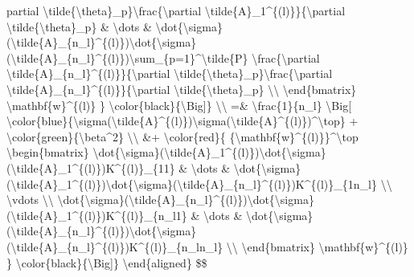 partial \textbackslash tilde\{\textbackslash theta\}\_p\}\textbackslash frac\{\textbackslash partial \textbackslash tilde\{A\}\_1\^{}\{(l)\}\}\{\textbackslash partial \textbackslash tilde\{\textbackslash theta\}\_p\} \& \textbackslash dots \& \textbackslash dot\{\textbackslash sigma\}(\textbackslash tilde\{A\}\_\{n\_l\}\^{}\{(l)\})\textbackslash dot\{\textbackslash sigma\}(\textbackslash tilde\{A\}\_\{n\_l\}\^{}\{(l)\})\textbackslash sum\_\{p=1\}\^{}\textbackslash tilde\{P\} \textbackslash frac\{\textbackslash partial \textbackslash tilde\{A\}\_\{n\_l\}\^{}\{(l)\}\}\{\textbackslash partial \textbackslash tilde\{\textbackslash theta\}\_p\}\textbackslash frac\{\textbackslash partial \textbackslash tilde\{A\}\_\{n\_l\}\^{}\{(l)\}\}\{\textbackslash partial \textbackslash tilde\{\textbackslash theta\}\_p\} \textbackslash\textbackslash{} \textbackslash end\{bmatrix\} \textbackslash mathbf\{w\}\^{}\{(l)\} \} \textbackslash color\{black\}\{\textbackslash Big{]}\} \textbackslash\textbackslash{} =\& \textbackslash frac\{1\}\{n\_l\} \textbackslash Big{[} \textbackslash color\{blue\}\{\textbackslash sigma(\textbackslash tilde\{A\}\^{}\{(l)\})\textbackslash sigma(\textbackslash tilde\{A\}\^{}\{(l)\})\^{}\textbackslash top\} + \textbackslash color\{green\}\{\textbackslash beta\^{}2\} \textbackslash\textbackslash{} \&+ \textbackslash color\{red\}\{ \{\textbackslash mathbf\{w\}\^{}\{(l)\}\}\^{}\textbackslash top \textbackslash begin\{bmatrix\} \textbackslash dot\{\textbackslash sigma\}(\textbackslash tilde\{A\}\_1\^{}\{(l)\})\textbackslash dot\{\textbackslash sigma\}(\textbackslash tilde\{A\}\_1\^{}\{(l)\})K\^{}\{(l)\}\_\{11\} \& \textbackslash dots \& \textbackslash dot\{\textbackslash sigma\}(\textbackslash tilde\{A\}\_1\^{}\{(l)\})\textbackslash dot\{\textbackslash sigma\}(\textbackslash tilde\{A\}\_\{n\_l\}\^{}\{(l)\})K\^{}\{(l)\}\_\{1n\_l\} \textbackslash\textbackslash{} \textbackslash vdots \textbackslash\textbackslash{} \textbackslash dot\{\textbackslash sigma\}(\textbackslash tilde\{A\}\_\{n\_l\}\^{}\{(l)\})\textbackslash dot\{\textbackslash sigma\}(\textbackslash tilde\{A\}\_1\^{}\{(l)\})K\^{}\{(l)\}\_\{n\_l1\} \& \textbackslash dots \& \textbackslash dot\{\textbackslash sigma\}(\textbackslash tilde\{A\}\_\{n\_l\}\^{}\{(l)\})\textbackslash dot\{\textbackslash sigma\}(\textbackslash tilde\{A\}\_\{n\_l\}\^{}\{(l)\})K\^{}\{(l)\}\_\{n\_ln\_l\} \textbackslash\textbackslash{} \textbackslash end\{bmatrix\} \textbackslash mathbf\{w\}\^{}\{(l)\} \} \textbackslash color\{black\}\{\textbackslash Big{]}\} \textbackslash end\{aligned\} \$\$

